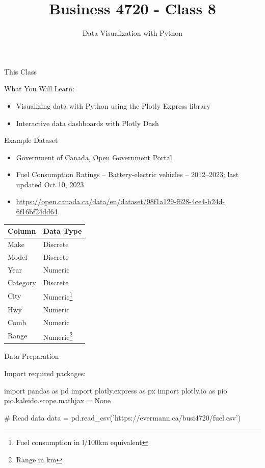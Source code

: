 \documentclass[ignorenonframetext,xcolor=x11names]{beamer}
\title{Business 4720 - Class 8}
\subtitle{Data Visualization with Python}
\begin{document}
\begin{frame}[label=full]{}
  \titlepage
  \footnotesize
  
\end{frame}

\begin{frame}[label=full]{This Class}

\begin{block}{What You Will Learn:}
\begin{itemize}
  \item Visualizing data with Python using the Plotly Express library
  \item Interactive data dashboards with Plotly Dash
\end{itemize}
\end{block}
\end{frame}

\begin{frame}[label=withcode]{Example Dataset}
\begin{itemize}
  \item Government of Canada, Open Government Portal
  \item Fuel Consumption Ratings -- Battery-electric vehicles -- 2012--2023; last updated Oct 10, 2023
  \item \href{https://open.canada.ca/data/en/dataset/98f1a129-f628-4ce4-b24d-6f16bf24dd64}{https://open.canada.ca/data/en/dataset/98f1a129-f628-4ce4-b24d-6f16bf24dd64}
\end{itemize}
\centering
\footnotesize
\renewcommand{\arraystretch}{1.25}
	\begin{tabular}{|l|l|} \hline
	  {\bf Column} & {\bf Data Type} \\ \hline \hline
	  Make & Discrete \\ 
	  Model & Discrete \\
	  Year & Numeric \\
	  Category & Discrete \\
	  City & Numeric\footnote{Fuel consumption in l/100km equivalent} \\
	  Hwy & Numeric \\
	  Comb & Numeric \\
	  Range & Numeric\footnote{Range in km} \\ \hline
	\end{tabular}
\end{frame}

\begin{frame}[label=withcode,fragile]{Data Preparation}

Import required packages:

\begin{pythoncode}
import pandas as pd
import plotly.express as px
import plotly.io as pio
pio.kaleido.scope.mathjax = None
\end{pythoncode}

\begin{pythoncode}
# Read data
data = pd.read_csv('https://evermann.ca/busi4720/fuel.csv')
\end{pythoncode}
\end{frame}
\end{document}
